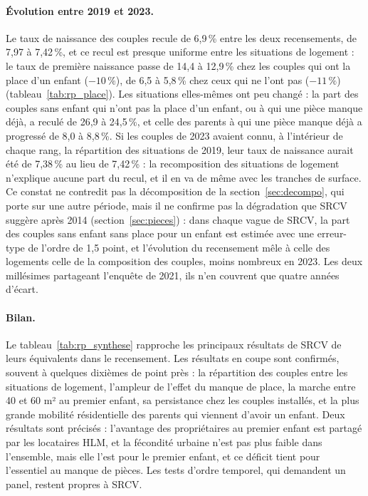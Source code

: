 \documentclass[11pt,a4paper]{article}
\theoremstyle{plain}
\theoremstyle{definition}
\theoremstyle{remark}
\begin{document}
\paragraph{Évolution entre 2019 et 2023.} Le taux de naissance des couples recule de 6,9\,\% entre les deux recensements, de 7,97 à 7,42\,\%, et ce recul est presque uniforme entre les situations de logement : le taux de première naissance passe de 14,4 à 12,9\,\% chez les couples qui ont la place d'un enfant ($-10\,\%$), de 6,5 à 5,8\,\% chez ceux qui ne l'ont pas ($-11\,\%$) (tableau~\ref{tab:rp_place}). Les situations elles-mêmes ont peu changé : la part des couples sans enfant qui n'ont pas la place d'un enfant, ou à qui une pièce manque déjà, a reculé de 26,9 à 24,5\,\%, et celle des parents à qui une pièce manque déjà a progressé de 8,0 à 8,8\,\%. Si les couples de 2023 avaient connu, à l'intérieur de chaque rang, la répartition des situations de 2019, leur taux de naissance aurait été de 7,38\,\% au lieu de 7,42\,\% : la recomposition des situations de logement n'explique aucune part du recul, et il en va de même avec les tranches de surface. Ce constat ne contredit pas la décomposition de la section~\ref{sec:decompo}, qui porte sur une autre période, mais il ne confirme pas la dégradation que SRCV suggère après 2014 (section~\ref{sec:pieces}) : dans chaque vague de SRCV, la part des couples sans enfant sans place pour un enfant est estimée avec une erreur-type de l'ordre de 1,5 point, et l'évolution du recensement mêle à celle des logements celle de la composition des couples, moins nombreux en 2023. Les deux millésimes partageant l'enquête de 2021, ils n'en couvrent que quatre années d'écart.

\paragraph{Bilan.} Le tableau~\ref{tab:rp_synthese} rapproche les principaux résultats de SRCV de leurs équivalents dans le recensement. Les résultats en coupe sont confirmés, souvent à quelques dixièmes de point près : la répartition des couples entre les situations de logement, l'ampleur de l'effet du manque de place, la marche entre 40 et 60 m² au premier enfant, sa persistance chez les couples installés, et la plus grande mobilité résidentielle des parents qui viennent d'avoir un enfant. Deux résultats sont précisés : l'avantage des propriétaires au premier enfant est partagé par les locataires HLM, et la fécondité urbaine n'est pas plus faible dans l'ensemble, mais elle l'est pour le premier enfant, et ce déficit tient pour l'essentiel au manque de pièces. Les tests d'ordre temporel, qui demandent un panel, restent propres à SRCV.
\end{document}
